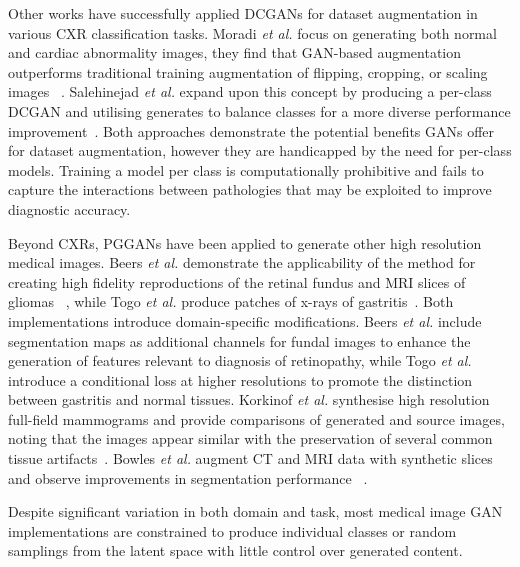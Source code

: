 \documentclass{article}
\begin{document}
Other works have successfully applied DCGANs for dataset augmentation in various CXR classification tasks. Moradi \emph{et al.} focus on generating both normal and cardiac abnormality images, they find that GAN-based augmentation outperforms traditional training augmentation of flipping, cropping, or scaling images~\cite{moradiChestXrayGeneration2018} . Salehinejad \emph{et al.} expand upon this concept by producing a per-class DCGAN and utilising generates to balance classes for a more diverse performance improvement~\cite{salehinejadSynthesizingChestXRay2019a}. Both approaches demonstrate the potential benefits GANs offer for dataset augmentation, however they are handicapped by the need for per-class models. Training a model per class is computationally prohibitive and fails to capture the interactions between pathologies that may be exploited to improve diagnostic accuracy.

Beyond CXRs, PGGANs have been applied to generate other high resolution medical images. Beers \emph{et al.} demonstrate the applicability of the method for creating high fidelity reproductions of the retinal fundus and MRI slices of gliomas ~\cite{beersHighresolutionMedicalImage2018}, while Togo \emph{et al.} produce patches of x-rays of gastritis~\cite{togoSyntheticGastritisImage2019}. Both implementations introduce domain-specific modifications. Beers \emph{et al.} include segmentation maps as additional channels for fundal images to enhance the generation of features relevant to diagnosis of retinopathy, while Togo \emph{et al.} introduce a conditional loss at higher resolutions to promote the distinction between gastritis and normal tissues.  Korkinof \emph{et al.} synthesise high resolution full-field mammograms and provide comparisons of generated and source images, noting that the images appear similar with the preservation of several common tissue artifacts~\cite{korkinofHighResolutionMammogramSynthesis2019}. Bowles \emph{et al.} augment CT and MRI data with synthetic slices and observe improvements in segmentation performance~ \cite{bowlesGANAugmentationAugmenting2018}.

Despite significant variation in both domain and task, most medical image GAN implementations are constrained to produce individual classes or random samplings from the latent space with little control over generated content.
\end{document}
